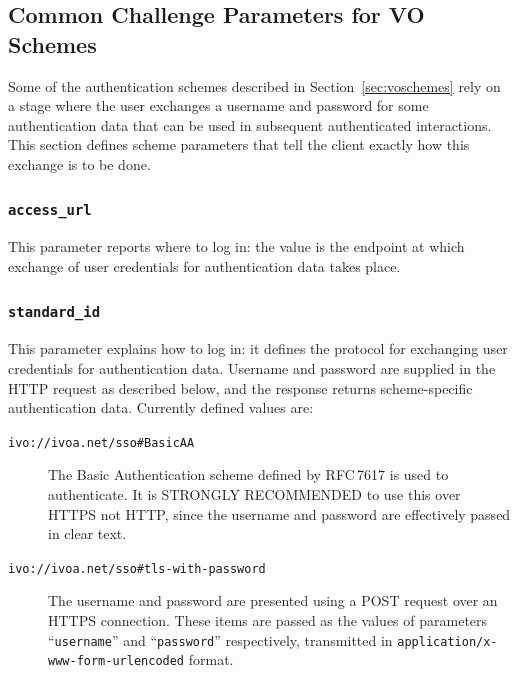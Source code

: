 \documentclass[11pt,a4paper]{ivoa}
\newcommand{\rfc}[1]{RFC\,#1}
\begin{document}
\subsection{Common Challenge Parameters for VO Schemes}
\label{sec:common-params}

Some of the authentication schemes described in Section~\ref{sec:voschemes}
rely on a stage where the user exchanges 
a username and password
for some authentication data that can be used in subsequent authenticated
interactions.
This section defines scheme parameters that
tell the client exactly how this exchange is to be done.

\subsubsection{\mbox{\tt access\_url}}
\label{sec:access-url}

This parameter reports where to log in:
the value is the endpoint at which
exchange of user credentials for authentication data
takes place.

\subsubsection{\mbox{\tt standard\_id}}
\label{sec:standard-id}

This parameter explains how to log in:
it defines the protocol for exchanging user credentials
for authentication data.
Username and password are supplied in the HTTP request as described below,
and the response returns scheme-specific authentication data.
Currently defined values are:

\begin{description}
  \item[{\tt ivo://ivoa.net/sso\#BasicAA}]
        The Basic Authentication scheme defined by \rfc{7617} is used to
        authenticate.
        It is STRONGLY RECOMMENDED to use this over HTTPS not HTTP,
        since the username and password are effectively passed in clear text.
  \item[{\tt ivo://ivoa.net/sso\#tls-with-password}]
        The username and password are presented using a POST request
        over an HTTPS connection.
        These items are passed as the values of parameters
        ``{\tt username}'' and ``{\tt password}'' respectively,
        transmitted in {\tt application/x-www-form-urlencoded} format.
\end{description}
\end{document}
